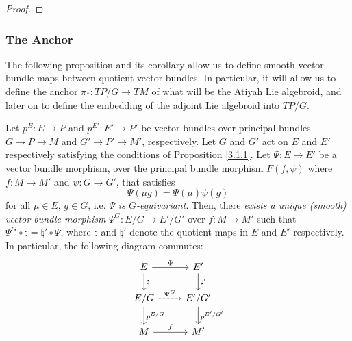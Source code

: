 \begin{proof}
\end{proof}

\subsubsection{The Anchor}

The following proposition and its corollary allow us to define smooth vector bundle maps between quotient vector bundles. In particular, it will allow us to define the anchor $\pi_*:TP/G \to TM$ of what will be the Atiyah Lie algebroid, and later on to define the embedding of the adjoint Lie algebroid into $TP/G$.

\begin{proposition} \label{3.1.2}
Let $p^E: E \to P$ and $p^{E'}: E' \to P'$ be vector bundles over principal bundles $G \to P \to M$ and $G' \to P' \to M'$, respectively. Let $G$ and $G'$ act on $E$ and $E'$ respectively satisfying the conditions of Proposition \ref{3.1.1}. Let $\Psi: E \to E'$ be a vector bundle morphism, over the principal bundle morphism $F(f, \psi)$ where $f:M\to M'$ and $\psi:G \to G'$, that satisfies \[\Psi(\mu g) = \Psi(\mu) \psi(g)\] for all $\mu \in E$, $g \in G$, i.e. \emph{$\Psi$ is $G$-equivariant}. Then, there \textit{exists a unique (smooth) vector bundle morphism} $\Psi^{G}: E/G \to E'/G'$ over $f: M \to M'$ such that $\Psi^{G} \circ \natural = \natural' \circ \Psi$, where $\natural$ and $\natural'$ denote the quotient maps in $E$ and $E'$ respectively. In particular, the following diagram commutes:
\begin{equation} \label{diagramQuotientMorph}
\begin{tikzcd}
    E   \ar{r}{\Psi}     \ar{d}{\natural} &   E'  \ar{d}{\natural'} \\
    E/G \ar[dashed]{r}{\Psi^{G}} \ar{d}{p^{E/G}}  & E'/G' \ar{d}{p^{E'/G'}} \\
    M \ar{r}{f} & M'
\end{tikzcd}
\end{equation}
\end{proposition}

